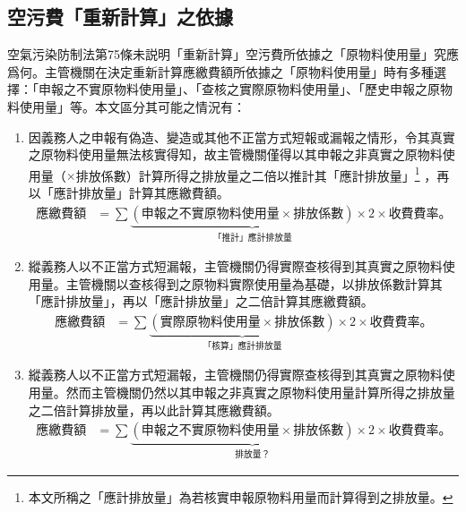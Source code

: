 \subsection{空污費「重新計算」之依據}
空氣污染防制法第75條未説明「重新計算」空污費所依據之「原物料使用量」究應爲何。主管機關在決定重新計算應繳費額所依據之「原物料使用量」時有多種選擇：「申報之不實原物料使用量」、「查核之實際原物料使用量」、「歷史申報之原物料使用量」等。本文區分其可能之情況有：
\begin{enumerate}
   \item 因義務人之申報有偽造、變造或其他不正當方式短報或漏報之情形，令其真實之原物料使用量無法核實得知，故主管機關僅得以其申報之非真實之原物料使用量（$\times $排放係數）計算所得之排放量之二倍以推計其「應計排放量」\footnote{本文所稱之「應計排放量」為若核實申報原物料用量而計算得到之排放量。}
   ，再以「應計排放量」計算其應繳費額。
   \begin{equation*}
      \begin{aligned}
         \text{應繳費額}
         &=\sum \underbrace{\left(\text{申報之不實原物料使用量}\times\text{排放係數}\right)\times 2}_{\textstyle\text{「推計」應計排放量}}\times
         \text{收費費率。}
      \end{aligned}
      \end{equation*}
   \item 縱義務人以不正當方式短漏報，主管機關仍得實際查核得到其真實之原物料使用量。主管機關以查核得到之原物料實際使用量為基礎，以排放係數計算其「應計排放量」，再以「應計排放量」之二倍計算其應繳費額。
   \begin{equation*}
      \begin{aligned}
         \text{應繳費額}
         &=\sum \underbrace{\left(\text{實際原物料使用量}\times\text{排放係數}\right)}_{\textstyle\text{「核算」應計排放量}}\times 2\times
         \text{收費費率。}
      \end{aligned}
      \end{equation*}
      \item 縱義務人以不正當方式短漏報，主管機關仍得實際查核得到其真實之原物料使用量。然而主管機關仍然以其申報之非真實之原物料使用量計算所得之排放量之二倍計算排放量，再以此計算其應繳費額。
      \begin{equation*}
         \begin{aligned}
            \text{應繳費額}
            &=\sum \underbrace{\left(\text{申報之不實原物料使用量}\times\text{排放係數}\right)\times 2}_{\textstyle\text{排放量？}}\times
            \text{收費費率。}
         \end{aligned}

\end{equation*}
\end{enumerate}
